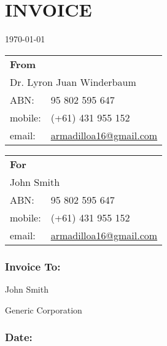 \documentclass[a4paper,12pt]{report}
\begin{document}
 

\chapter*{INVOICE}

\today

\begin{multicols}{2}
\begin{flushleft}


\begin{tabular}{ll}
\textbf{From} & \\
\multicolumn{2}{l}{Dr. Lyron Juan Winderbaum} \\
ABN: & 95 802 595 647 \\
mobile: & (+61) 431 955 152 \\
email: & \href{mailto:armadilloa16@gmail.com}{armadilloa16@gmail.com} \\
\end{tabular}
\end{flushleft}

\begin{flushright}
\begin{tabular}{ll}
\textbf{For} & \\
\multicolumn{2}{l}{John Smith} \\
ABN: & 95 802 595 647 \\
mobile: & (+61) 431 955 152 \\
email: & \href{mailto:armadilloa16@gmail.com}{armadilloa16@gmail.com} \\
\end{tabular}
\end{flushright}
\end{multicols}                                  

\subsection*{Invoice To:}

John Smith

Generic Corporation

\subsection*{Date:}
\end{document}
